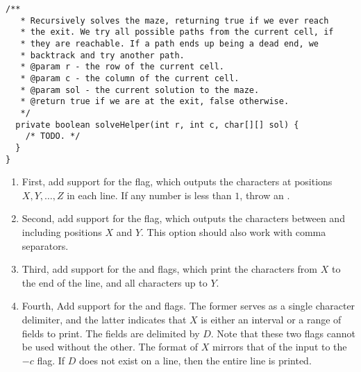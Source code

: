 \begin{enumerate}[label=(\alph*)]
\begin{lstlisting}[language=MyJava]
  /**
   * Recursively solves the maze, returning true if we ever reach
   * the exit. We try all possible paths from the current cell, if
   * they are reachable. If a path ends up being a dead end, we 
   * backtrack and try another path.
   * @param r - the row of the current cell.
   * @param c - the column of the current cell.
   * @param sol - the current solution to the maze.
   * @return true if we are at the exit, false otherwise.
   */
  private boolean solveHelper(int r, int c, char[][] sol) { 
    /* TODO. */ 
  }
}
\end{lstlisting}
\end{enumerate}


\begin{enumerate}[label=(\alph*)]
    \item First, add support for the  flag, which outputs the characters at positions $X,Y,\ldots,Z$ in each line. If any number is less than $1$, throw an .
    \item Second, add support for the  flag, which outputs the characters between and including positions $X$ and $Y$. This option should also work with comma separators.
    \item Third, add support for the  and  flags, which print the characters from $X$ to the end of the line, and all characters up to $Y$.
    \item Fourth, Add support for the  and  flags. The former serves as a single character delimiter, and the latter indicates that $X$ is either an interval or a range of fields to print. The fields are delimited by $D$. Note that these two flags cannot be used without the other. The format of $X$ mirrors that of the input to the $-c$ flag. If $D$ does not exist on a line, then the entire line is printed.
\end{enumerate}


